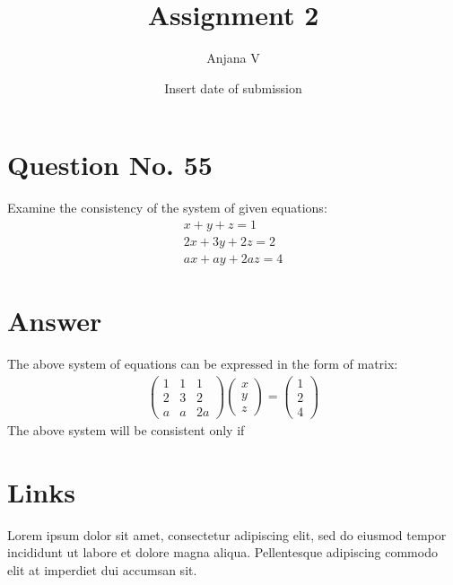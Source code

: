 \documentclass{article}
\title{Assignment 2}
\author{Anjana V }
\date{Insert date of submission}
\begin{document}
\newcommand{\myvec}[1]{\ensuremath{\begin{pmatrix}#1\end{pmatrix}}}
\renewcommand{\vec}[1]{\mathbf{#1}}
\maketitle
\section{Question No. 55}
Examine the consistency of the system of given equations:
\begin{align}
		x+y+z =1 
		\\2x+3y+2z = 2
		\\ax+ay+2az = 4
\end{align}
\section{Answer}
The above system of equations can be expressed in the form of matrix:
\begin{align}
\myvec{1 & 1 & 1\\2 & 3 & 2\\a & a & 2a} \myvec{x\\y\\z} = \myvec{1\\2\\4}
\end{align}
The above system will be consistent only if 
\section*{Links}
Lorem ipsum dolor sit amet, consectetur adipiscing elit, sed do eiusmod tempor incididunt ut labore et dolore magna aliqua. Pellentesque adipiscing commodo elit at imperdiet dui accumsan sit.
\end{document}
